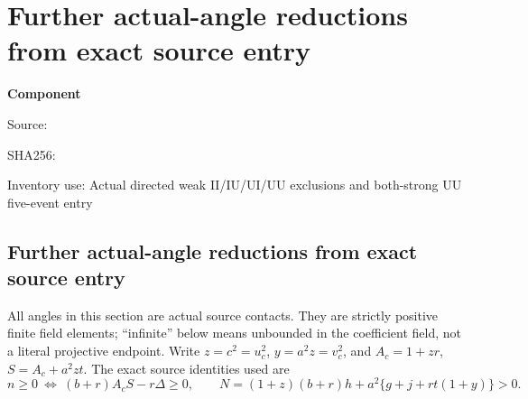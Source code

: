 \chapter{Further actual-angle reductions from exact source entry}
\label{component:pe56fb394b522}
\noindent\textbf{Component }\par
{\small\noindent Source: \par}
{\small\noindent SHA256: \par}
{\small\noindent Inventory use: Actual directed weak II/IU/UI/UU exclusions and both-strong UU five-event entry\par}
\medskip
\section[Further actual-angle reductions from exact source entry]{Further actual-angle reductions from exact source entry}
\label{pe56fb394b522:sec:c2-angle-reductions}

All angles in this section are actual source contacts. They are strictly
positive finite field elements; ``infinite'' below means unbounded in
the coefficient field, not a literal projective endpoint. Write
$z=c^2=u_c^2$, $y=a^2z=v_c^2$, and
$A_c=1+zr$, $S=A_c+a^2zt$. The exact source identities used are
\[
 n\ge0\ \Longleftrightarrow\ (b+r)A_cS-r\Delta\ge0,
 \qquad
 N=(1+z)(b+r)h+a^2\{g+j+rt(1+y)\}>0.
\]

